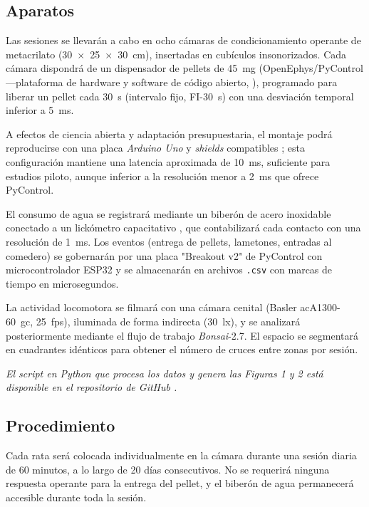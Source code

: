\documentclass[12pt,a4paper]{article}
\begin{document}
\begin{multicols}{2}
\subsection*{Aparatos}

Las sesiones se llevarán a cabo en ocho cámaras de condicionamiento operante de metacrilato (30~×~25~×~30~cm), insertadas en cubículos insonorizados. Cada cámara dispondrá de un dispensador de pellets de 45~mg (OpenEphys/PyControl —plataforma de hardware y software de código abierto, \citep{PelletDispenserGitHub}), programado para liberar un pellet cada 30~s (intervalo fijo, FI-30~s) con una desviación temporal inferior a 5~ms.

A efectos de ciencia abierta y adaptación presupuestaria, el montaje podrá reproducirse con una placa \textit{Arduino Uno} y \textit{shields} compatibles \citep{Arduino2024}; esta configuración mantiene una latencia aproximada de 10~ms, suficiente para estudios piloto, aunque inferior a la resolución menor a 2~ms que ofrece PyControl.

El consumo de agua se registrará mediante un biberón de acero inoxidable conectado a un lickómetro capacitativo \citep{pycontrol_lickometer}, que contabilizará cada contacto con una resolución de 1~ms. Los eventos (entrega de pellets, lametones, entradas al comedero) se gobernarán por una placa "Breakout v2" de PyControl con microcontrolador ESP32 y se almacenarán en archivos \texttt{.csv} con marcas de tiempo en microsegundos.

La actividad locomotora se filmará con una cámara cenital (Basler acA1300-60~gc, 25~fps), iluminada de forma indirecta (30~lx), y se analizará posteriormente mediante el flujo de trabajo \textit{Bonsai}-2.7. El espacio se segmentará en cuadrantes idénticos para obtener el número de cruces entre zonas por sesión.

\textit{El script en Python que procesa los datos y genera las Figuras 1 y 2 está disponible en el repositorio de GitHub \citep{Pena2025}.
}

\subsection*{Procedimiento}

Cada rata será colocada individualmente en la cámara durante una sesión diaria de 60 minutos, a lo largo de 20 días consecutivos. No se requerirá ninguna respuesta operante para la entrega del pellet, y el biberón de agua permanecerá accesible durante toda la sesión.


\end{multicols}
\end{document}
